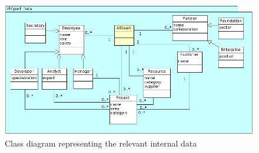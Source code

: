 %
%
\begin{figure}[!ht]
\centering
\includegraphics[scale=0.63,angle=90]{argouml_diags/imgs/data2}
\caption{Class diagram representing the relevant internal data}
\label{img:data2}
\end{figure}
